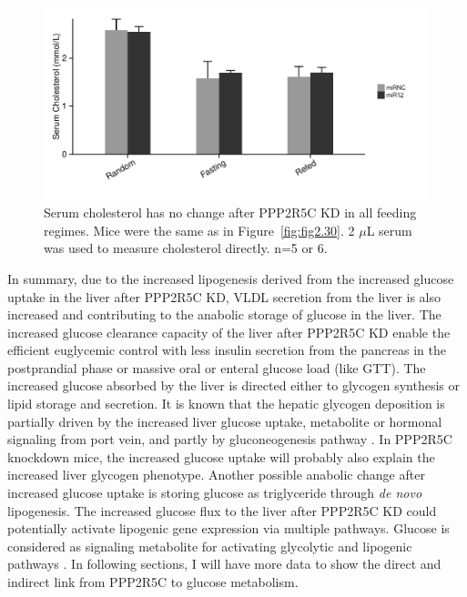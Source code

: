 \begin{figure}[htbp]
\centering
\includegraphics[width=1\textwidth]{figs/fig2-36 serum chol.pdf}
\caption[Serum cholesterol level remains no change]{\footnotesize Serum cholesterol has no change after PPP2R5C KD in all feeding regimes. Mice were the same as in Figure~\ref{fig:fig2.30}. 2 $\mu$L serum was used to measure cholesterol directly. n=5 or 6.}
\label{fig:fig2.36}
\end{figure}

In summary, due to the increased lipogenesis derived from the increased glucose uptake in the liver after PPP2R5C KD, VLDL secretion from the liver is also increased and contributing to the anabolic storage of glucose in the liver. The increased glucose clearance capacity of the liver after PPP2R5C KD enable the efficient euglycemic control with less insulin secretion from the pancreas in the postprandial phase or massive oral or enteral glucose load (like GTT). The increased glucose absorbed by the liver is  directed either to glycogen synthesis or lipid storage and secretion. It is known that the hepatic glycogen deposition is partially driven by the increased liver glucose uptake, metabolite or hormonal signaling from port vein, and partly by gluconeogenesis pathway \cite{radziuk_hepatic_2001}. In PPP2R5C knockdown mice, the increased glucose uptake will probably also explain the increased liver glycogen phenotype. Another possible anabolic change after increased glucose uptake is storing glucose as triglyceride through \textit{de novo} lipogenesis. The increased glucose flux to the liver after PPP2R5C KD could potentially activate lipogenic gene expression via multiple pathways. Glucose is considered as signaling metabolite for activating glycolytic and lipogenic pathways \cite{foufelle_new_2002}. In following sections, I will have more data to show the direct and indirect link from PPP2R5C to glucose metabolism.


